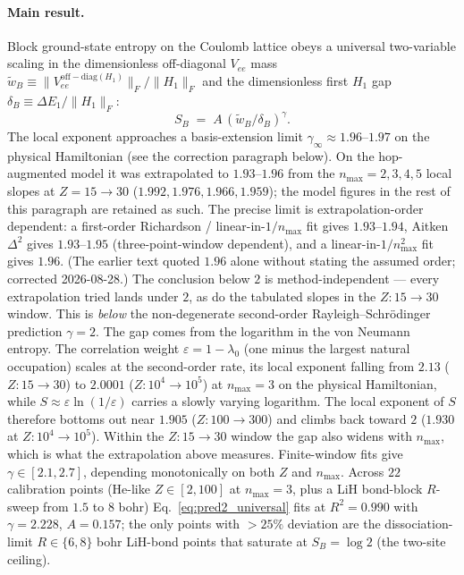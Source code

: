 \documentclass[twocolumn,pra,amsmath,amssymb,superscriptaddress]{revtex4-2}
\begin{document}
\paragraph*{Main result.}  Block ground-state entropy on the
Coulomb lattice obeys a universal two-variable scaling in the
dimensionless off-diagonal $V_{ee}$ mass
$\tilde{w}_B \equiv \lVert V_{ee}^{\mathrm{off-diag}(H_1)}\rVert_F
/ \lVert H_1 \rVert_F$ and the dimensionless first $H_1$ gap
$\delta_B \equiv \Delta E_1 / \lVert H_1 \rVert_F$:
\begin{equation}
  S_B \;=\; A\,(\tilde{w}_B / \delta_B)^{\gamma}.
  \label{eq:pred2_universal}
\end{equation}
The local exponent approaches a basis-extension limit
$\gamma_{\infty} \approx 1.96$--$1.97$ on the physical Hamiltonian (see
the correction paragraph below).  On the hop-augmented model it was
extrapolated to $1.93$--$1.96$ from the $n_{\max}=2,3,4,5$ local
slopes at $Z=15\to 30$ ($1.992, 1.976, 1.966, 1.959$); the model
figures in the rest of this paragraph are retained as such.  The precise
limit is extrapolation-order dependent: a first-order Richardson /
linear-in-$1/n_{\max}$ fit gives $1.93$--$1.94$, Aitken $\Delta^2$
gives $1.93$--$1.95$ (three-point-window dependent), and a
linear-in-$1/n_{\max}^2$ fit gives $1.96$.
(The earlier text quoted $1.96$ alone without stating the assumed
order; corrected 2026-08-28.)  The conclusion below $2$ is
method-independent --- every extrapolation tried lands under $2$,
as do the tabulated slopes in the $Z:15\to30$ window.  This is \emph{below} the
non-degenerate second-order Rayleigh--Schr\"odinger prediction
$\gamma=2$.  The gap comes from the logarithm in the von Neumann
entropy.  The correlation weight $\varepsilon = 1-\lambda_0$ (one
minus the largest natural occupation) scales at the second-order
rate, its local exponent falling from $2.13$ ($Z:15\to30$) to
$2.0001$ ($Z:10^4\to10^5$) at $n_{\max}=3$ on the physical
Hamiltonian, while $S\approx\varepsilon\ln(1/\varepsilon)$ carries a
slowly varying logarithm.  The local exponent of $S$ therefore
bottoms out near $1.905$ ($Z:100\to300$) and climbs back toward $2$
($1.930$ at $Z:10^4\to10^5$).  Within the $Z:15\to30$ window the gap
also widens with $n_{\max}$, which is what the extrapolation above
measures.
Finite-window fits give $\gamma \in [2.1, 2.7]$, depending
monotonically on both $Z$ and $n_{\max}$.  Across $22$ calibration points
(He-like $Z\in[2,100]$ at $n_{\max}=3$, plus a LiH bond-block
$R$-sweep from $1.5$ to $8$ bohr) Eq.~\eqref{eq:pred2_universal}
fits at $R^{2}=0.990$ with $\gamma = 2.228$, $A = 0.157$; the
only points with $>25\%$ deviation are the dissociation-limit
$R\in\{6,8\}$ bohr LiH-bond points that saturate at
$S_B = \log 2$ (the two-site ceiling).
\end{document}
